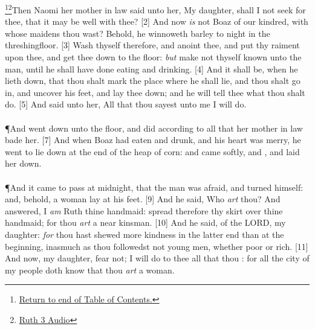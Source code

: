 \footnote{\textcolor[cmyk]{0.99998,1,0,0}{\hyperlink{TOC}{Return to end of Table of Contents.}}}\footnote{\href{https://audiobible.com/bible/ruth_3.html}{\textcolor[cmyk]{0.99998,1,0,0}{Ruth 3 Audio}}}\textcolor[cmyk]{0.99998,1,0,0}{Then Naomi her mother in law said unto her, My daughter, shall I not seek  for thee, that it may be well with thee?}
[2] \textcolor[cmyk]{0.99998,1,0,0}{And now \emph{is} not Boaz of our kindred, with whose maidens thou wast? Behold, he winnoweth barley to night in the threshingfloor.}
[3] \textcolor[cmyk]{0.99998,1,0,0}{Wash thyself therefore, and anoint thee, and put thy raiment upon thee, and get thee down to the floor: \emph{but} make not thyself known unto the man, until he shall have done eating and drinking.}
[4] \textcolor[cmyk]{0.99998,1,0,0}{And it shall be, when he lieth down, that thou shalt mark the place where he shall lie, and thou shalt go in, and uncover his feet, and lay thee down; and he will tell thee what thou shalt do.}
[5] \textcolor[cmyk]{0.99998,1,0,0}{And  said unto her, All that thou sayest unto me I will do.}\\
\\
\P \textcolor[cmyk]{0.99998,1,0,0}{And  went down unto the floor, and did according to all that her mother in law bade her.}
[7] \textcolor[cmyk]{0.99998,1,0,0}{And when Boaz had eaten and drunk, and his heart was merry, he went to lie down at the end of the heap of corn: and  came softly, and , and laid her down.}\\
\\
\P \textcolor[cmyk]{0.99998,1,0,0}{And it came to pass at midnight, that the man was afraid, and turned himself: and, behold, a woman lay at his feet.}
[9] \textcolor[cmyk]{0.99998,1,0,0}{And he said, Who \emph{art} thou? And  answered, I \emph{am} Ruth thine handmaid: spread therefore thy skirt over thine handmaid; for thou \emph{art} a near kinsman.}
[10] \textcolor[cmyk]{0.99998,1,0,0}{And he said,  of the LORD, my daughter: \emph{for} thou hast shewed more kindness in the latter end than at the beginning, inasmuch as thou followedst not young men, whether poor or rich.}
[11] \textcolor[cmyk]{0.99998,1,0,0}{And now, my daughter, fear not; I will do to thee all that thou : for all the city of my people doth know that thou \emph{art} a  woman.}
